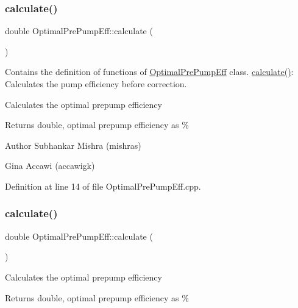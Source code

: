 \subsubsection{\texorpdfstring{calculate()}{calculate()}\hspace{0.1cm}{\footnotesize\ttfamily [1/3]}}
{\footnotesize\ttfamily double Optimal\+Pre\+Pump\+Eff\+::calculate (\begin{DoxyParamCaption}{ }\end{DoxyParamCaption})}



Contains the definition of functions of \hyperlink{class_optimal_pre_pump_eff}{Optimal\+Pre\+Pump\+Eff} class. \hyperlink{class_optimal_pre_pump_eff_a7ced63984a89975c4f8f54642701d841}{calculate()}\+: Calculates the pump efficiency before correction. 

Calculates the optimal prepump efficiency \begin{DoxyReturn}{Returns}
double, optimal prepump efficiency as \%
\end{DoxyReturn}
\begin{DoxyAuthor}{Author}
Subhankar Mishra (mishras) 

Gina Accawi (accawigk) 
\end{DoxyAuthor}


Definition at line 14 of file Optimal\+Pre\+Pump\+Eff.\+cpp.

\mbox{\label{class_optimal_pre_pump_eff_a7ced63984a89975c4f8f54642701d841}} 
\subsubsection{\texorpdfstring{calculate()}{calculate()}\hspace{0.1cm}{\footnotesize\ttfamily [2/3]}}
{\footnotesize\ttfamily double Optimal\+Pre\+Pump\+Eff\+::calculate (\begin{DoxyParamCaption}{ }\end{DoxyParamCaption})}

Calculates the optimal prepump efficiency \begin{DoxyReturn}{Returns}
double, optimal prepump efficiency as \% 
\end{DoxyReturn}
\mbox{\label{class_optimal_pre_pump_eff_a7ced63984a89975c4f8f54642701d841}} 
